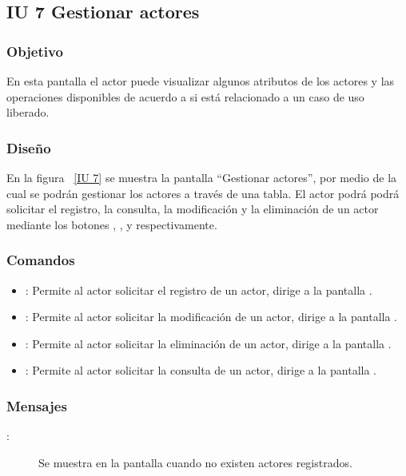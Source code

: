 \subsection{IU 7 Gestionar actores}
\subsubsection{Objetivo}
	
	En esta pantalla el actor puede visualizar algunos atributos de los actores y las operaciones disponibles de acuerdo a si está relacionado a un caso de uso liberado.

\subsubsection{Diseño}

    En la figura ~\ref{IU 7} se muestra la pantalla ``Gestionar actores'', por medio de la cual 
    se podrán gestionar los actores a través de una tabla.
    El actor podrá podrá solicitar el registro, la consulta, la modificación y la eliminación de un actor mediante los botones
    , \btnConsulta, \btnEditar y \btnEliminar respectivamente. \\



\subsubsection{Comandos}
\begin{itemize}
	\item {}: Permite al actor solicitar el registro de un actor, dirige a la pantalla .
	\item \btnEditar[Modificar]: Permite al actor solicitar la modificación de un actor, dirige a la pantalla .
	\item \btnEliminar[Eliminar]: Permite al actor solicitar la eliminación de un actor, dirige a la pantalla .
	\item \btnConsulta[Consultar]: Permite al actor solicitar la consulta de un actor, dirige a la pantalla .
\end{itemize}

\subsubsection{Mensajes}

	
\begin{description}
	\item[:] Se muestra en la pantalla  cuando no existen actores registrados.
\end{description}

